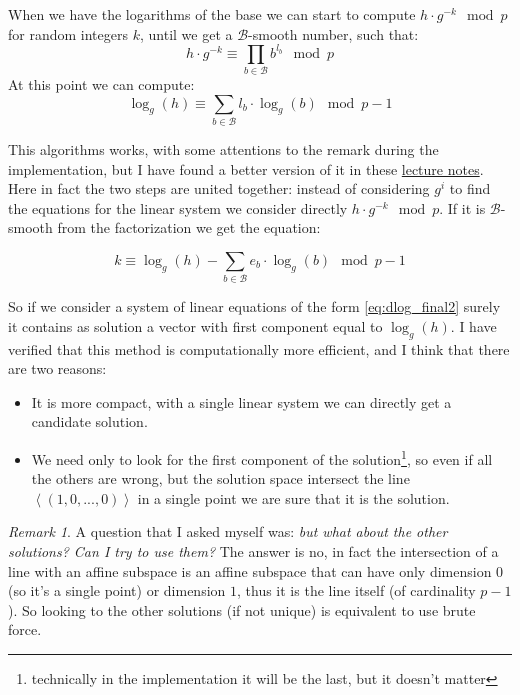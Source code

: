 \documentclass{article}
\newcommand{\BB}{\mathcal{B}}
\theoremstyle{plain}
\theoremstyle{remark}
\newtheorem{rem}{Remark}
\theoremstyle{definition}
\begin{document}
When we have the logarithms of the base we can start to compute $h\cdot g^{-k} \mod p$ for random integers $k$, until we get a $\BB$-smooth number, such that:
\begin{equation*}
	h\cdot g^{-k} \equiv \prod_{b \in \BB} b^{l_b} \mod p
\end{equation*}
At this point we can compute:
\begin{equation}
	\label{eq:dlog_final1}
	\log_g(h) \equiv \sum_{b \in \BB} l_b \cdot \log_g(b) \mod p-1
\end{equation}

This algorithms works, with some attentions to the remark during the implementation, but I have found a better version of it in these \href{https://math.mit.edu/classes/18.783/2021/LectureNotes10.pdf}{lecture notes}. 
Here in fact the two steps are united together: instead of considering $g^i$ to find the equations for the linear system we consider directly $h\cdot g^{-k} \mod p$. If it is $\BB$-smooth from the factorization we get the equation:

\begin{equation}
	\label{eq:dlog_final2}
	k \equiv \log_g(h) - \sum_{b \in \BB} e_b \cdot \log_g(b) \mod p-1
\end{equation}

So if we consider a system of linear equations of the form \ref{eq:dlog_final2} surely it contains as solution a vector with first component equal to $\log_g(h)$. I have verified that this method is computationally more efficient, and I think that there are two reasons:
\begin{itemize}
	\item It is more compact, with a single linear system we can directly get a candidate solution. 
	\item We need only to look for the first component of the solution\footnote{technically in the implementation it will be the last, but it doesn't matter}, so even if all the others are wrong, but the solution space intersect the line $\left< (1,0,...,0)\right>$ in a single point we are sure that it is the solution. 
\end{itemize}

\begin{rem}
	A question that I asked myself was: \textit{but what about the other solutions? Can I try to use them?} The answer is no, in fact the intersection of a line with an affine subspace is an affine subspace that can have only dimension $0$ (so it's a single point) or dimension $1$, thus it is the line itself (of cardinality $p-1$). So looking to the other solutions (if not unique) is equivalent to use brute force.
\end{rem}
\end{document}
